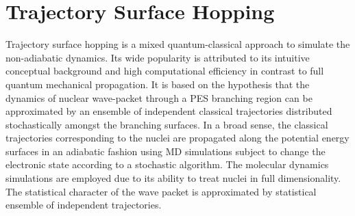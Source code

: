 \section{Trajectory Surface Hopping}
Trajectory surface hopping is a mixed quantum-classical approach to simulate the non-adiabatic dynamics.\cite{tully_1,dephasing_2} Its wide popularity is attributed to its intuitive conceptual background and high computational efficiency in contrast to full quantum mechanical propagation. It is based on the hypothesis that the dynamics of nuclear wave-packet through a PES branching region can be approximated by an ensemble of independent classical trajectories distributed stochastically amongst the branching surfaces.
    In a broad sense, the classical  trajectories  corresponding  to  the  nuclei  are  propagated  along  the  potential  energy surfaces in an adiabatic fashion using MD simulations subject to change the electronic state according to a stochastic  algorithm. The molecular dynamics simulations are employed due to its ability to treat nuclei in full dimensionality. The  statistical  character of the wave packet is approximated by statistical ensemble of independent trajectories.

